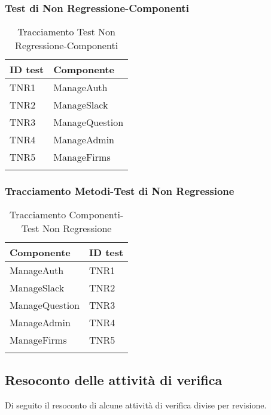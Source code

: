 \documentclass[../PianoDiQualifica_v3.0.0.tex]{subfiles}
\begin{document}
	\subsubsection{Test di Non Regressione-Componenti}
	\begin{longtable}[c] {>{\centering\arraybackslash}p{4cm} >{\centering\arraybackslash}p{4cm}}
		\toprule
		\centerline{\textbf{ID test}} & \centerline{\textbf{Componente}} \\
			\midrule
			TNR1 & ManageAuth \\
			\addlinespace[0.3em]
			\midrule
			\addlinespace[0.3em]
			TNR2 & ManageSlack \\
			\addlinespace[0.3em]
			\midrule
			\addlinespace[0.3em]
			TNR3 & ManageQuestion \\
			\addlinespace[0.3em]
			\midrule
			\addlinespace[0.3em]
			TNR4 & ManageAdmin \\
			\addlinespace[0.3em]
			\midrule
			\addlinespace[0.3em]
			TNR5 & ManageFirms \\
			\bottomrule
			\caption{Tracciamento Test Non Regressione-Componenti}
	\end{longtable}

	\subsubsection{Tracciamento Metodi-Test di Non Regressione}
	\begin{longtable}[c] {>{\centering\arraybackslash}p{4cm} >{\centering\arraybackslash}p{4cm}}
		\toprule
		\centerline{\textbf{Componente}} & \centerline{\textbf{ID test}} \\
			\midrule
			 ManageAuth & TNR1 \\
			\addlinespace[0.3em]
			\midrule
			\addlinespace[0.3em]
			ManageSlack & TNR2 \\
			\addlinespace[0.3em]
			\midrule
			\addlinespace[0.3em]
			ManageQuestion & TNR3 \\
			\addlinespace[0.3em]
			\midrule
			\addlinespace[0.3em]
			ManageAdmin & TNR4 \\
			\addlinespace[0.3em]
			\midrule
			\addlinespace[0.3em]
			ManageFirms & TNR5 \\
			\bottomrule
			\caption{Tracciamento Componenti-Test Non Regressione}
	\end{longtable}

	\subsection{Resoconto delle attività di verifica}
		Di seguito il resoconto di alcune attività di verifica divise per revisione.
\end{document}
